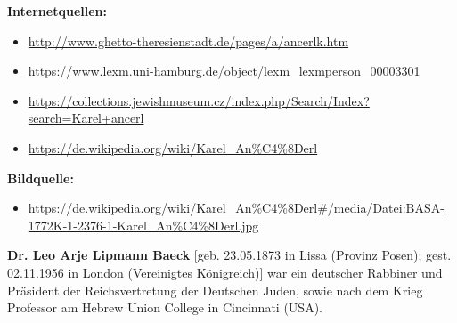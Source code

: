 \documentclass[a4paper]{article}
\begin{document}
\bigskip

\textbf{Internetquellen:}

\begin{itemize}
\item \url{http://www.ghetto-theresienstadt.de/pages/a/ancerlk.htm}
\item \url{https://www.lexm.uni-hamburg.de/object/lexm_lexmperson_00003301}
\item \url{https://collections.jewishmuseum.cz/index.php/Search/Index?search=Karel+ancerl} 
\item \url{https://de.wikipedia.org/wiki/Karel_An%C4%8Derl}
\end{itemize}

\bigskip

\textbf{Bildquelle:}

\begin{itemize}
\item \url{https://de.wikipedia.org/wiki/Karel_An%C4%8Derl#/media/Datei:BASA-1772K-1-2376-1-Karel_An%C4%8Derl.jpg}
\end{itemize}
\textbf{Dr. Leo Arje Lipmann Baeck} [geb. 23.05.1873 in Lissa (Provinz Posen); gest. 02.11.1956 in London (Vereinigtes
Königreich)] war ein deutscher Rabbiner und Präsident der Reichsvertretung der Deutschen Juden, sowie nach dem Krieg
Professor am Hebrew Union College in Cincinnati (USA).
\end{document}
